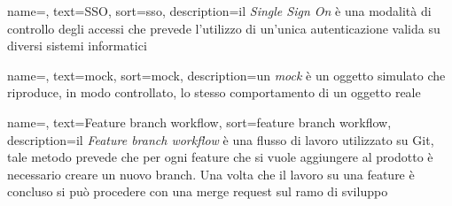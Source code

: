 {
    name=,
    text=SSO,
    sort=sso,
    description={il \emph{Single Sign On} è una modalità di controllo degli accessi che prevede l'utilizzo di un'unica autenticazione valida su diversi sistemi informatici}
}

{
    name=,
    text=mock,
    sort=mock,
    description={un \emph{mock} è un oggetto simulato che riproduce, in modo controllato, lo stesso comportamento di un oggetto reale}
}

{
    name=,
    text=Feature branch workflow,
    sort=feature branch workflow,
    description={il \emph{Feature branch workflow} è una flusso di lavoro utilizzato su Git, tale metodo prevede che per ogni feature che si vuole aggiungere al prodotto è necessario creare un nuovo branch. Una volta che il lavoro su una feature è concluso si può procedere con una merge request sul ramo di sviluppo}
}